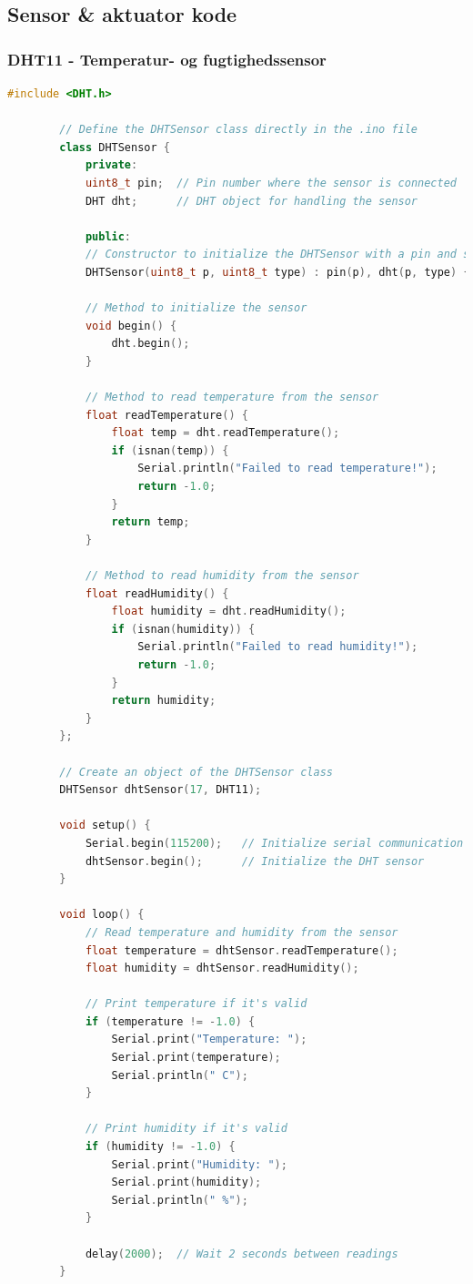 \documentclass[12pt,a4paper]{book}
\begin{document}
	\clearpage
	
	\subsection*{Sensor \& aktuator kode}
	\subsubsection*{DHT11 - Temperatur- og fugtighedssensor}
	\begin{lstlisting}[language=C++]
		#include <DHT.h>
		
		// Define the DHTSensor class directly in the .ino file
		class DHTSensor {
			private:
			uint8_t pin;  // Pin number where the sensor is connected
			DHT dht;      // DHT object for handling the sensor
			
			public:
			// Constructor to initialize the DHTSensor with a pin and sensor type (DHT11/DHT22)
			DHTSensor(uint8_t p, uint8_t type) : pin(p), dht(p, type) {}
			
			// Method to initialize the sensor
			void begin() {
				dht.begin();
			}
			
			// Method to read temperature from the sensor
			float readTemperature() {
				float temp = dht.readTemperature();
				if (isnan(temp)) {
					Serial.println("Failed to read temperature!");
					return -1.0;
				}
				return temp;
			}
			
			// Method to read humidity from the sensor
			float readHumidity() {
				float humidity = dht.readHumidity();
				if (isnan(humidity)) {
					Serial.println("Failed to read humidity!");
					return -1.0;
				}
				return humidity;
			}
		};
		
		// Create an object of the DHTSensor class
		DHTSensor dhtSensor(17, DHT11);
		
		void setup() {
			Serial.begin(115200);   // Initialize serial communication at 115200 baud rate
			dhtSensor.begin();      // Initialize the DHT sensor
		}
		
		void loop() {
			// Read temperature and humidity from the sensor
			float temperature = dhtSensor.readTemperature();
			float humidity = dhtSensor.readHumidity();
			
			// Print temperature if it's valid
			if (temperature != -1.0) {
				Serial.print("Temperature: ");
				Serial.print(temperature);
				Serial.println(" C");
			}
			
			// Print humidity if it's valid
			if (humidity != -1.0) {
				Serial.print("Humidity: ");
				Serial.print(humidity);
				Serial.println(" %");
			}
			
			delay(2000);  // Wait 2 seconds between readings
		}
	\end{lstlisting}
	\clearpage
\end{document}
